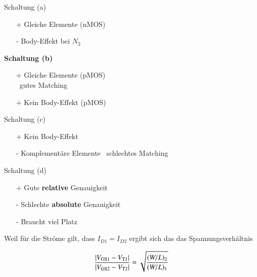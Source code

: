 \begin{minipage}[t]{0.36\columnwidth}
    Schaltung (a)
    \begin{itemize}
        \item[+] Gleiche Elemente (nMOS)
        \item[-] Body-Effekt bei $N_2$
    \end{itemize}
   
    \smallskip

    \textbf{Schaltung (b)}
    \begin{itemize}
        \item[+] Gleiche Elemente (pMOS) \\
            \textrightarrow\ gutes Matching
        \item[+] Kein Body-Effekt (pMOS)
    \end{itemize}
\end{minipage}
\hfill
\begin{minipage}[t]{0.6\columnwidth}
    Schaltung (c)
    \begin{itemize}
        \item[+] Kein Body-Effekt
        \item[-] Komplementäre Elemente
            \textrightarrow\ schlechtes Matching
    \end{itemize}
   
    \smallskip

    Schaltung (d)
    \begin{itemize}
        \item[+] Gute \textbf{relative} Genauigkeit
        \item[-] Schlechte \textbf{absolute} Genauigkeit
        \item[-] Braucht viel Platz 
    \end{itemize}
\end{minipage}

\smallskip

\begin{minipage}[c]{0.55\columnwidth}
    Weil für die Ströme gilt, dass $I_{D1} = I_{D2}$ ergibt sich das das Spannungsverhältnis
\end{minipage}
\hfill
\begin{minipage}[c]{0.4\columnwidth}
    \[
        \frac{\left|V_{\rm GS1} - V_{\rm T1}\right|}{\left|V_{\rm GS2} - V_{\rm T2}\right|} = \sqrt{\frac{(W / L)_2}{(W / L)_1}}
    \]
\end{minipage}